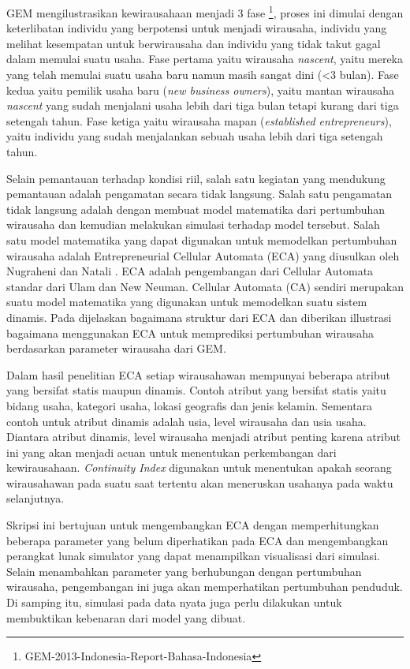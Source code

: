 GEM mengilustrasikan kewirausahaan menjadi 3 fase \footnote{GEM-2013-Indonesia-Report-Bahasa-Indonesia}, proses ini dimulai dengan keterlibatan individu yang berpotensi untuk menjadi wirausaha, individu yang melihat kesempatan untuk berwirausaha dan individu yang tidak takut gagal dalam memulai suatu usaha. Fase pertama yaitu wirausaha \textit{nascent}, yaitu mereka yang telah memulai suatu usaha baru namun masih sangat dini (<3 bulan). Fase kedua yaitu pemilik usaha baru (\textit{new business owners}), yaitu mantan wirausaha \textit{nascent} yang sudah menjalani usaha lebih dari tiga bulan tetapi kurang dari tiga setengah tahun. Fase ketiga yaitu wirausaha mapan (\textit{established entrepreneurs}), yaitu individu yang sudah menjalankan sebuah usaha lebih dari tiga setengah tahun.


Selain pemantauan terhadap kondisi riil, salah satu kegiatan yang mendukung pemantauan adalah pengamatan secara tidak langsung. Salah satu pengamatan tidak langsung adalah dengan membuat model matematika dari pertumbuhan wirausaha dan kemudian melakukan simulasi terhadap model tersebut. Salah satu model matematika yang dapat digunakan untuk memodelkan pertumbuhan wirausaha adalah Entrepreneurial Cellular Automata (ECA) yang diusulkan oleh Nugraheni dan Natali \footnotemark[\value{footnote}]. ECA adalah pengembangan dari Cellular Automata standar dari Ulam dan New Neuman. Cellular Automata (CA) sendiri merupakan suatu model matematika yang digunakan untuk memodelkan suatu sistem dinamis. Pada \footnotemark[\value{footnote}
] dijelaskan bagaimana struktur dari ECA dan diberikan illustrasi bagaimana menggunakan ECA untuk memprediksi pertumbuhan wirausaha berdasarkan parameter wirausaha dari GEM. 


Dalam hasil penelitian ECA setiap wirausahawan mempunyai beberapa atribut yang bersifat statis maupun dinamis. Contoh atribut yang bersifat statis yaitu bidang usaha, kategori usaha, lokasi geografis dan jenis kelamin. Sementara contoh untuk atribut dinamis adalah usia, level wirausaha dan usia usaha. Diantara atribut dinamis, level wirausaha menjadi atribut penting karena atribut ini yang akan menjadi acuan untuk menentukan perkembangan dari kewirausahaan. \textit{Continuity Index} digunakan untuk menentukan apakah seorang wirausahawan pada suatu saat tertentu akan meneruskan usahanya pada waktu selanjutnya.


Skripsi ini bertujuan untuk mengembangkan ECA dengan memperhitungkan beberapa parameter yang belum diperhatikan pada ECA dan mengembangkan perangkat lunak simulator yang dapat menampilkan visualisasi dari simulasi. Selain menambahkan parameter yang berhubungan dengan pertumbuhan wirausaha, pengembangan ini juga akan memperhatikan pertumbuhan penduduk. Di samping itu, simulasi pada data nyata juga perlu dilakukan untuk membuktikan kebenaran dari model yang dibuat.

